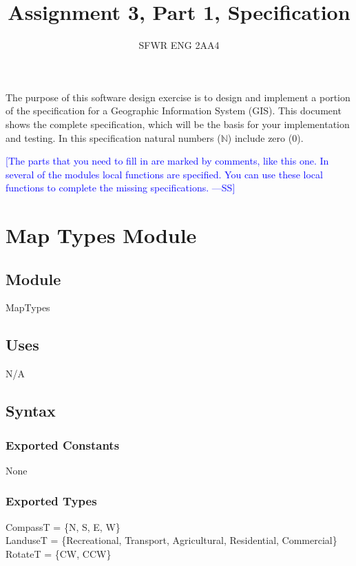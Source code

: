 \documentclass[12pt]{article}
\title{Assignment 3, Part 1, Specification}
\author{SFWR ENG 2AA4}
\newcommand{\authornote}[3]{\textcolor{#1}{[#3 ---#2]}}
\newcommand{\authornote}[3]{}
\newcommand{\wss}[1]{\authornote{blue}{SS}{#1}}
\begin{document}
\maketitle

The purpose of this software design exercise is to design and implement a
portion of the specification for a Geographic Information System (GIS).  This
document shows the complete specification, which will be the basis for your
implementation and testing.  In this specification natural numbers
($\mathbb{N}$) include zero ($0$).

\wss{The parts that you need to fill in are marked by comments, like this one.
  In several of the modules local functions are specified.  You can use these
  local functions to complete the missing specifications.}

\newpage

\section* {Map Types Module}

\subsection*{Module}

MapTypes

\subsection* {Uses}

N/A

\subsection* {Syntax}

\subsubsection* {Exported Constants}

None

\subsubsection* {Exported Types}

CompassT = \{N, S, E, W\}\\ 
LanduseT = \{Recreational, Transport, Agricultural, Residential, Commercial\}\\
RotateT = \{CW, CCW\}
\end{document}
